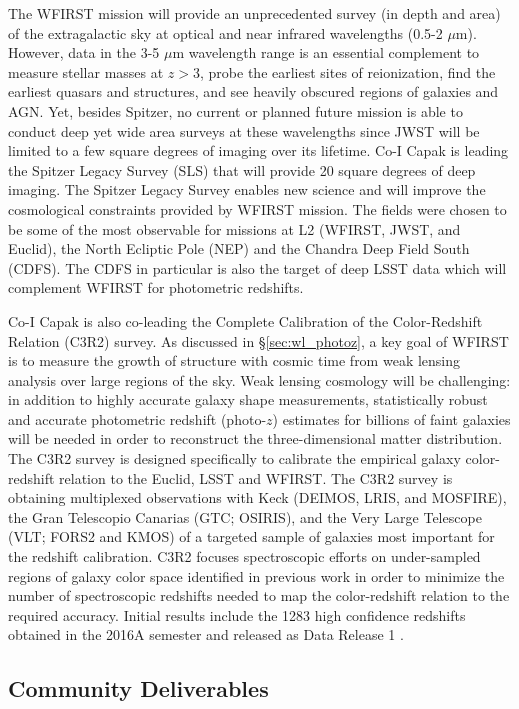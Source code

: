 The WFIRST mission will provide an unprecedented survey (in depth and area) of the extragalactic sky at optical and near infrared wavelengths (0.5-2 $\mu$m).  However, data in the 3-5 $\mu$m wavelength range is an essential complement to measure stellar masses at $z>$3, probe the earliest sites of reionization, find the earliest quasars and structures, and see heavily obscured regions of galaxies and AGN.  Yet, besides Spitzer, no current or planned future mission is able to conduct deep yet wide area surveys at these wavelengths since JWST will be limited to a few square degrees of imaging over its lifetime. Co-I Capak is leading the Spitzer Legacy Survey (SLS) that will provide 20 square degrees of deep imaging. The Spitzer Legacy Survey enables new science and will improve the cosmological constraints provided by WFIRST mission.  The fields were chosen to be some of the most observable for missions at L2 (WFIRST, JWST, and Euclid), the North Ecliptic Pole (NEP) and the Chandra Deep Field South (CDFS).  The CDFS in particular is also the target of deep LSST data which will complement WFIRST for photometric redshifts.

Co-I Capak is also co-leading the Complete Calibration of the Color-Redshift Relation (C3R2) survey. As discussed in \S \ref{sec:wl_photoz}, a key goal of WFIRST is to measure the growth of structure with cosmic time from weak lensing analysis over large regions of the sky. Weak lensing cosmology will be challenging: in addition to highly accurate galaxy shape measurements, statistically robust and accurate photometric redshift (photo-$z$) estimates for billions of faint galaxies will be needed in order to reconstruct the three-dimensional matter distribution. The C3R2 survey is designed specifically to calibrate the empirical galaxy color-redshift relation to the Euclid, LSST and WFIRST. The C3R2 survey is obtaining multiplexed observations with Keck (DEIMOS, LRIS, and MOSFIRE), the Gran Telescopio Canarias (GTC; OSIRIS), and the Very Large Telescope (VLT; FORS2 and KMOS) of a targeted sample of galaxies most important for the redshift calibration. C3R2 focuses spectroscopic efforts on under-sampled regions of galaxy color space identified in previous work in order to minimize the number of spectroscopic redshifts needed to map the color-redshift relation to the required accuracy. Initial results include the 1283 high confidence redshifts obtained in the 2016A semester and released as Data Release 1 \citep{Masters:2107}.


\subsection{Community Deliverables}

